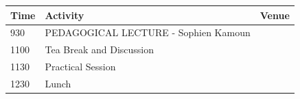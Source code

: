 \documentclass[12pt,]{book}
\theoremstyle{definition}
\theoremstyle{definition}
\theoremstyle{remark}
\begin{document}
\begin{longtable}[]{@{}lll@{}}
\toprule
\begin{minipage}[b]{0.09\columnwidth}\raggedright\strut
Time\strut
\end{minipage} & \begin{minipage}[b]{0.39\columnwidth}\raggedright\strut
Activity\strut
\end{minipage} & \begin{minipage}[b]{0.13\columnwidth}\raggedright\strut
Venue\strut
\end{minipage}\tabularnewline
\midrule
\endhead
\begin{minipage}[t]{0.09\columnwidth}\raggedright\strut
930\strut
\end{minipage} & \begin{minipage}[t]{0.39\columnwidth}\raggedright\strut
PEDAGOGICAL LECTURE - Sophien Kamoun\strut
\end{minipage} & \begin{minipage}[t]{0.13\columnwidth}\raggedright\strut
\strut
\end{minipage}\tabularnewline
\begin{minipage}[t]{0.09\columnwidth}\raggedright\strut
1100\strut
\end{minipage} & \begin{minipage}[t]{0.39\columnwidth}\raggedright\strut
Tea Break and Discussion\strut
\end{minipage} & \begin{minipage}[t]{0.13\columnwidth}\raggedright\strut
\strut
\end{minipage}\tabularnewline
\begin{minipage}[t]{0.09\columnwidth}\raggedright\strut
1130\strut
\end{minipage} & \begin{minipage}[t]{0.39\columnwidth}\raggedright\strut
Practical Session\strut
\end{minipage} & \begin{minipage}[t]{0.13\columnwidth}\raggedright\strut
\strut
\end{minipage}\tabularnewline
\begin{minipage}[t]{0.09\columnwidth}\raggedright\strut
1230\strut
\end{minipage} & \begin{minipage}[t]{0.39\columnwidth}\raggedright\strut
Lunch\strut
\end{minipage} & \begin{minipage}[t]{0.13\columnwidth}\raggedright\strut

\end{minipage}
\end{longtable}
\end{document}
